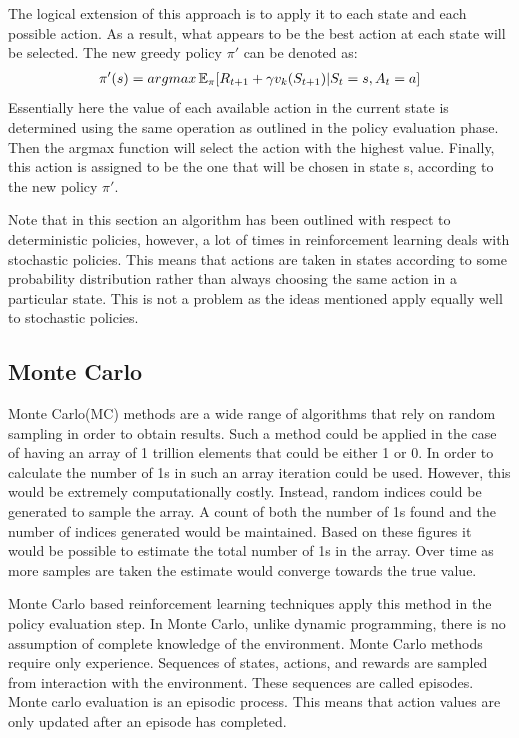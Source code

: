 The logical extension of this approach is to apply it to each state and each possible action.
As a result, what appears to be the best action at each state will be selected.
The new greedy policy $\pi'$ can be denoted as:
\begin{align}
    \pi'(s) = argmax\operatorname{\mathbb{E}}_{\pi}\lbrack R_{t+1} + \gamma v_k(S_{t+1}) | S_t = s, A_t = a\rbrack
\end{align}
Essentially here the value of each available action in the current state is determined using the same operation
as outlined in the policy evaluation phase.
Then the argmax function will select the action with the highest value.
Finally, this action is assigned to be the one that will be chosen in state s, according to the new policy $\pi'$.

Note that in this section an algorithm has been outlined with respect to deterministic policies,
however, a lot of times in reinforcement learning deals with stochastic policies.
This means that actions are taken in states according to some probability distribution rather than always choosing
the same action in a particular state.
This is not a problem as the ideas mentioned apply equally well to stochastic policies.

\subsection{Monte Carlo}\label{subsec:mc}
Monte Carlo(MC) methods are a wide range of algorithms that rely on random sampling in order to obtain results.
Such a method could be applied in the case of having an array of 1 trillion elements that could be
either 1 or 0.
In order to calculate the number of 1s in such an array iteration could be used.
However, this would be extremely computationally costly.
Instead, random indices could be generated to sample the array.
A count of both the number of 1s found and the number of indices generated would be maintained.
Based on these figures it would be possible to estimate the total number of 1s in the array.
Over time as more samples are taken the estimate would converge towards the true value.

Monte Carlo based reinforcement learning techniques apply this method in the policy evaluation step.
In Monte Carlo, unlike dynamic programming, there is no assumption of complete knowledge of the environment.
Monte Carlo methods require only experience.
Sequences of states, actions, and rewards are sampled from interaction with the
environment\citep{sutton1998reinforcement}.
These sequences are called episodes.
Monte carlo evaluation is an episodic process.
This means that action values are only updated after an episode has completed.

